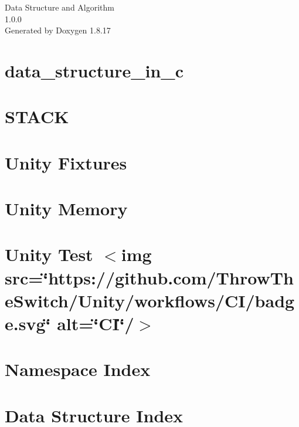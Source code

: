 \let\mypdfximage\pdfximage\def\pdfximage{\immediate\mypdfximage}\documentclass[twoside]{book}
\newcommand{\+}{\discretionary{\mbox{\scriptsize$\hookleftarrow$}}{}{}}
\newcommand{\clearemptydoublepage}{%
  \newpage{\pagestyle{empty}\cleardoublepage}%
}
\begin{document}
\hypersetup{pageanchor=false,
             bookmarksnumbered=true,
             pdfencoding=unicode
            }
\begin{titlepage}
\vspace*{7cm}
\begin{center}%
{\Large Data Structure and Algorithm \\[1ex]\large 1.\+0.\+0 }\\
\vspace*{1cm}
{\large Generated by Doxygen 1.8.17}\\
\end{center}
\end{titlepage}
\clearemptydoublepage
{}
\tableofcontents
\clearemptydoublepage
{}
\hypersetup{pageanchor=true}

\chapter{data\+\_\+structure\+\_\+in\+\_\+c}
\label{a00195}

\chapter{S\+T\+A\+CK}
\label{a00196}

\chapter{Unity Fixtures}
\label{a00197}

\chapter{Unity Memory}
\label{a00198}

\chapter{Unity Test $<$img src=\char`\"{}https\+://github.\+com/\+Throw\+The\+Switch/\+Unity/workflows/\+C\+I/badge.\+svg\char`\"{} alt=\char`\"{}\+C\+I\char`\"{}/$>$}
\label{a00199}

\chapter{Namespace Index}

\chapter{Data Structure Index}

\end{document}
